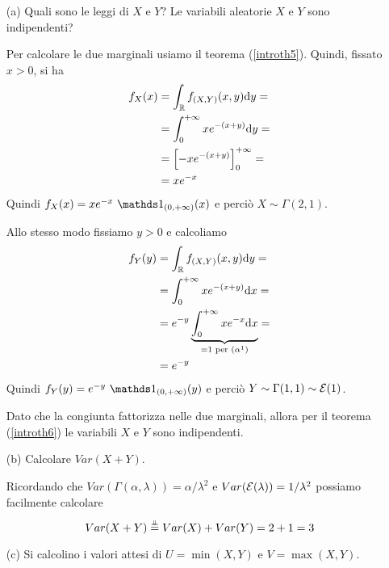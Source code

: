 \Soluzione{}
\begin{enumerate}
\item [(a)] Quali sono le leggi di $X$ e $Y$? Le variabili aleatorie $X$ e $Y$ sono indipendenti?

Per calcolare le due marginali usiamo il teorema (\ref{introth5}). Quindi, fissato $x>0$, si ha
\begin{gather*}
\begin{aligned}
f_X(x)&=\int_{\mathbb{R}}f_{(X,Y)}(x,y)\mathrm{d} y=\\
&=\int_{0}^{+\infty} xe^{-(x+y)}\mathrm{d} y=\\
&=\left[-xe^{-(x+y)}  \right]_0^{+\infty}=\\
&=xe^{-x}
\end{aligned}
\end{gather*}
Quindi $f_X(x)=xe^{-x}\ \Ind_{(0,+\infty)}(x)$ e perciò $X\sim\Gamma(2,1)$.

Allo stesso modo fissiamo $y>0$ e calcoliamo
\begin{gather*}
\begin{aligned}
f_Y(y)&=\int_{\mathbb{R}}f_{(X,Y)}(x,y)\mathrm{d} y=\\
&=\int_{0}^{+\infty} xe^{-(x+y)}\mathrm{d} x=\\
&=e^{-y}\underbrace{\int_{0}^{+\infty} xe^{-x}\mathrm{d} x}_{=1\text{ per }(\alpha^1)}=\\
&=e^{-y}
\end{aligned}
\end{gather*}
Quindi $f_Y(y)=e^{-y}\ \Ind_{(0,+\infty)}(y)$ e perciò $Y\sim\Gamma(1,1)\sim\mathcal{E}(1)$.

Dato che la congiunta fattorizza nelle due marginali, allora per il teorema (\ref{introth6}) le variabili $X$ e $Y$ sono indipendenti.
\item [(b)] Calcolare $Var(X+Y)$.

Ricordando che $Var(\Gamma(\alpha,\lambda))=\alpha/\lambda^2$ e $Var(\mathcal{E}(\lambda))=1/\lambda^2$ possiamo facilmente calcolare
\[
Var(X+Y)\overset{\underset{\indep}{}}{=}Var(X)+Var(Y)=2+1=3
\]
\item [(c)] Si calcolino i valori attesi di $U=\min(X,Y)$ e $V=\max(X,Y)$.


\end{enumerate}
